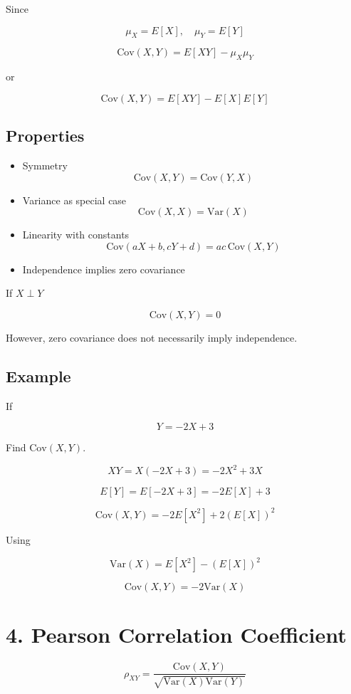 \documentclass[11pt]{article}
\begin{document}
Since

\[
\mu_X = E[X], \quad \mu_Y = E[Y]
\]

\[
\text{Cov}(X,Y) = E[XY] - \mu_X\mu_Y
\]

or

\[
\text{Cov}(X,Y) = E[XY] - E[X]E[Y]
\]

\subsection*{Properties}

\begin{itemize}
\item Symmetry
\[
\text{Cov}(X,Y) = \text{Cov}(Y,X)
\]

\item Variance as special case
\[
\text{Cov}(X,X) = \text{Var}(X)
\]

\item Linearity with constants
\[
\text{Cov}(aX+b, cY+d) = ac\,\text{Cov}(X,Y)
\]

\item Independence implies zero covariance
\end{itemize}

If $X \perp Y$

\[
\text{Cov}(X,Y)=0
\]

However, zero covariance does not necessarily imply independence.

\subsection*{Example}

If

\[
Y = -2X + 3
\]

Find $\text{Cov}(X,Y)$.

\[
XY = X(-2X+3) = -2X^2 + 3X
\]

\[
E[Y] = E[-2X+3] = -2E[X] + 3
\]

\[
\text{Cov}(X,Y) = -2E[X^2] + 2(E[X])^2
\]

Using

\[
\text{Var}(X) = E[X^2] - (E[X])^2
\]

\[
\text{Cov}(X,Y) = -2\text{Var}(X)
\]

\section*{4. Pearson Correlation Coefficient}

\[
\rho_{XY} =
\frac{\text{Cov}(X,Y)}{\sqrt{\text{Var}(X)\text{Var}(Y)}}
\]
\end{document}
